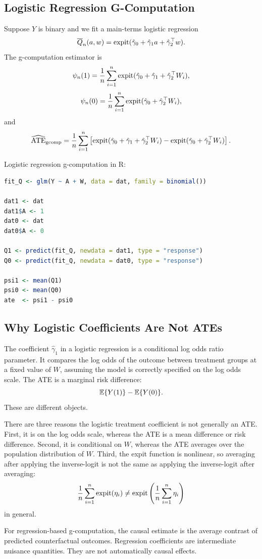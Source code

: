\subsection{Logistic Regression G-Computation}

Suppose $Y$ is binary and we fit a main-terms logistic regression
\[
\overline{Q}_n(a,w)
=
\operatorname{expit}(\hat\gamma_0+\hat\gamma_1a+\hat\gamma_2^\top w).
\]
The g-computation estimator is
\[
\psi_n(1)
=
\frac{1}{n}\sum_{i=1}^n
\operatorname{expit}(\hat\gamma_0+\hat\gamma_1+\hat\gamma_2^\top W_i),
\]
\[
\psi_n(0)
=
\frac{1}{n}\sum_{i=1}^n
\operatorname{expit}(\hat\gamma_0+\hat\gamma_2^\top W_i),
\]
and
\[
\widehat{\operatorname{ATE}}_{\mathrm{gcomp}}
=
\frac{1}{n}\sum_{i=1}^n
\left[
\operatorname{expit}(\hat\gamma_0+\hat\gamma_1+\hat\gamma_2^\top W_i)
-
\operatorname{expit}(\hat\gamma_0+\hat\gamma_2^\top W_i)
\right].
\]

\begin{implementationbox}
Logistic regression g-computation in R:
\begin{lstlisting}[language=R]
fit_Q <- glm(Y ~ A + W, data = dat, family = binomial())

dat1 <- dat
dat1$A <- 1
dat0 <- dat
dat0$A <- 0

Q1 <- predict(fit_Q, newdata = dat1, type = "response")
Q0 <- predict(fit_Q, newdata = dat0, type = "response")

psi1 <- mean(Q1)
psi0 <- mean(Q0)
ate  <- psi1 - psi0
\end{lstlisting}
\end{implementationbox}

\subsection{Why Logistic Coefficients Are Not ATEs}

The coefficient $\hat\gamma_1$ in a logistic regression is a conditional log odds ratio
parameter. It compares the log odds of the outcome between treatment groups at a
fixed value of $W$, assuming the model is correctly specified on the log odds scale.
The ATE is a marginal risk difference:
\[
\mathbb{E}\{Y(1)\}-\mathbb{E}\{Y(0)\}.
\]
These are different objects.

There are three reasons the logistic treatment coefficient is not generally an ATE.
First, it is on the log odds scale, whereas the ATE is a mean difference or risk
difference. Second, it is conditional on $W$, whereas the ATE averages over the
population distribution of $W$. Third, the expit function is nonlinear, so averaging
after applying the inverse-logit is not the same as applying the inverse-logit after
averaging:
\[
\frac{1}{n}\sum_{i=1}^n \operatorname{expit}(\eta_i)
\neq
\operatorname{expit}\left(\frac{1}{n}\sum_{i=1}^n \eta_i\right)
\]
in general.

\begin{keyidea}
For regression-based g-computation, the causal estimate is the average contrast of
predicted counterfactual outcomes. Regression coefficients are intermediate
nuisance quantities. They are not automatically causal effects.
\end{keyidea}
